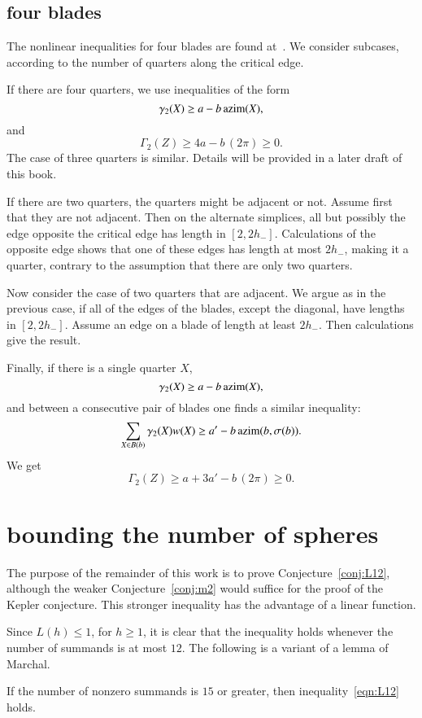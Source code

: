 \subsection{four blades}

The nonlinear inequalities for four blades are found at~\cite[cc:4bl]{hales:2009:nonlinear}.
We consider subcases, according to the number of quarters along the critical edge.

If there are four quarters, we use inequalities of the form
$$
\gamma_2(X) \ge a - b\, {\operatorname{azim}}(X),
$$
and
$$
\Gamma_2(Z) \ge 4 a  - b\, (2\pi) \ge 0.
$$
The case of three quarters is similar.  Details will be provided in a later draft of this book.



If there are two quarters, the quarters might be adjacent or not.  Assume first that they are not adjacent.  Then
on the alternate simplices, all but possibly the edge
opposite the critical edge has length in $[2,2h_-]$.
Calculations of the opposite edge shows that
one of these edges has length at most $2h_-$, making it a quarter, contrary to the assumption that there are only two quarters.

Now consider the case of two quarters that are adjacent.  We argue as in the previous case, if all of the edges of the blades, except the diagonal, have lengths in $[2,2h_-]$.  Assume an edge on a blade of length at least $2h_-$.  Then calculations give the result.

Finally, if there is a single quarter $X$, 
$$
\gamma_2(X) \ge a - b\, {\operatorname{azim}}(X),
$$
and 
between a consecutive pair of blades
one finds a similar inequality:
$$
\sum_{X\in B(b)} \gamma_2(X)w(X) \ge a' - b\,{\operatorname{azim}}(b,\sigma(b)).
$$
We get
$$
\Gamma_2(Z) \ge  a + 3 a' - b\, (2\pi) \ge 0.
$$

\section{bounding the number of spheres}

The purpose of the remainder of this work is to prove Conjecture~\ref{conj:L12}, although the weaker Conjecture~\ref{conj:m2} would suffice for the proof of the Kepler conjecture.  This stronger inequality has the advantage of a linear function.

Since $L(h)\le 1$, for $h\ge1$, it is clear that the inequality holds whenever the number of summands is at most $12$. The following is a variant of a lemma of Marchal.


\begin{lemma}\label{lemma:13-14}  If the number of nonzero summands is $15$ or greater, then inequality~\ref{eqn:L12} holds.
\end{lemma}

